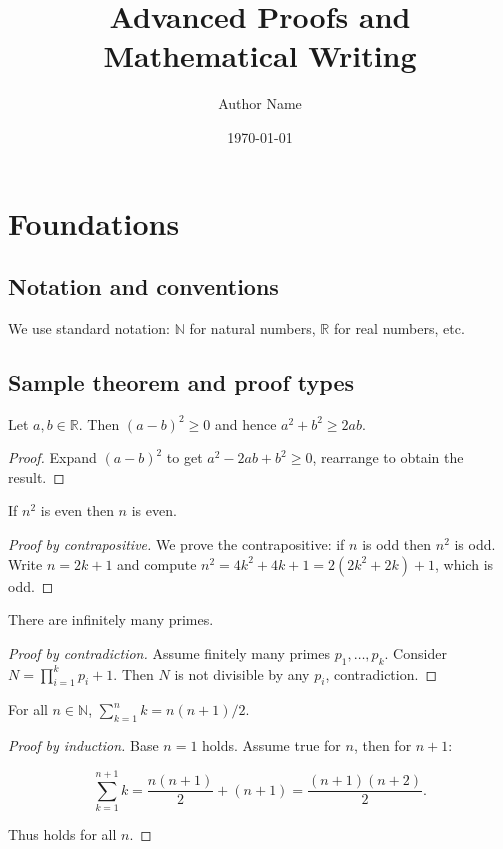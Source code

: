 \documentclass[12pt,oneside]{book}
\title{Advanced Proofs and Mathematical Writing}
\author{Author Name}
\date{\today}
\newcommand{\R}{\mathbb{R}}
\newcommand{\N}{\mathbb{N}}
\begin{document}
\frontmatter
\maketitle
\tableofcontents
\listoffigures
\listoftables
\mainmatter

\chapter{Foundations}
\minitoc

\section{Notation and conventions}
We use standard notation: $\N$ for natural numbers, $\R$ for real numbers, etc.

\section{Sample theorem and proof types}

\begin{theorem}
Let $a,b\in\R$. Then $(a-b)^2\ge 0$ and hence $a^2+b^2\ge 2ab$.
\end{theorem}
\begin{proof}
Expand $(a-b)^2$ to get $a^2-2ab+b^2\ge 0$, rearrange to obtain the result.
\end{proof}

\begin{theorem}
If $n^2$ is even then $n$ is even.
\end{theorem}
\begin{proof}[Proof by contrapositive]
We prove the contrapositive: if $n$ is odd then $n^2$ is odd. Write $n=2k+1$ and compute $n^2=4k^2+4k+1=2(2k^2+2k)+1$, which is odd.
\end{proof}

\begin{theorem}
There are infinitely many primes.
\end{theorem}
\begin{proof}[Proof by contradiction]
Assume finitely many primes $p_1,\dots,p_k$. Consider $N=\prod_{i=1}^k p_i +1$. Then $N$ is not divisible by any $p_i$, contradiction.
\end{proof}

\begin{theorem}
For all $n\in\N$, $\sum_{k=1}^n k = n(n+1)/2$.
\end{theorem}
\begin{proof}[Proof by induction]
Base $n=1$ holds. Assume true for $n$, then for $n+1$:


\[
\sum_{k=1}^{n+1} k = \frac{n(n+1)}{2} + (n+1) = \frac{(n+1)(n+2)}{2}.
\]


Thus holds for all $n$.
\end{proof}
\end{document}
